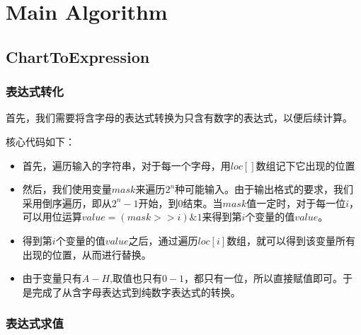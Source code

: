 \section{Main Algorithm}

\subsection{ChartToExpression}
\subsubsection{表达式转化}
	首先，我们需要将含字母的表达式转换为只含有数字的表达式，以便后续计算。
	
	核心代码如下：
	
	\begin{itemize}
		\item	首先，遍历输入的字符串，对于每一个字母，用$loc[]$数组记下它出现的位置
		\item	然后，我们使用变量$mask$来遍历$2 ^ n$种可能输入。由于输出格式的要求，我们采用倒序遍历，即从$2^n - 1$开始，到$0$结束。当$mask$值一定时，对于每一位$i$，可以用位运算$value = (mask >> i) \& 1$来得到第$i$个变量的值$value$。
		\item	得到第$i$个变量的值$value$之后，通过遍历$loc[i]$数组，就可以得到该变量所有出现的位置，从而进行替换。
		\item	由于变量只有$A - H$,取值也只有$0 - 1$，都只有一位，所以直接赋值即可。于是完成了从含字母表达式到纯数字表达式的转换。
	\end{itemize}
\subsubsection{表达式求值}
